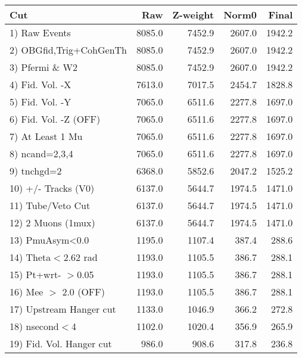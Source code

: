  \begin{table}[h!]\centering
 \begin{tabular}{||l||r|r|r|r||}
 \hline
 \hline
 Cut & Raw & Z-weight & Norm0 & Final \\
 \hline
  1) Raw Events           &      8085.0 &      7452.9 &      2607.0 &      1942.2 \\
  2) OBGfid,Trig+CohGenTh &      8085.0 &      7452.9 &      2607.0 &      1942.2 \\
  3) Pfermi \& W2         &      8085.0 &      7452.9 &      2607.0 &      1942.2 \\
  4) Fid. Vol. -X         &      7613.0 &      7017.5 &      2454.7 &      1828.8 \\
  5) Fid. Vol. -Y         &      7065.0 &      6511.6 &      2277.8 &      1697.0 \\
  6) Fid. Vol. -Z (OFF)   &      7065.0 &      6511.6 &      2277.8 &      1697.0 \\
  7) At Least 1 Mu        &      7065.0 &      6511.6 &      2277.8 &      1697.0 \\
  8) ncand=2,3,4          &      7065.0 &      6511.6 &      2277.8 &      1697.0 \\
  9) tnchgd=2             &      6368.0 &      5852.6 &      2047.2 &      1525.2 \\
 10) +/- Tracks (V0)      &      6137.0 &      5644.7 &      1974.5 &      1471.0 \\
 11) Tube/Veto Cut        &      6137.0 &      5644.7 &      1974.5 &      1471.0 \\
 12) 2 Muons (1mux)       &      6137.0 &      5644.7 &      1974.5 &      1471.0 \\
 13) PmuAsym<0.0          &      1195.0 &      1107.4 &       387.4 &       288.6 \\
 14) Theta$<$2.62 rad     &      1193.0 &      1105.5 &       386.7 &       288.1 \\
 15) Pt+wrt- $>$0.05      &      1193.0 &      1105.5 &       386.7 &       288.1 \\
 16) Mee $>$ 2.0  (OFF)   &      1193.0 &      1105.5 &       386.7 &       288.1 \\
 17) Upstream Hanger cut  &      1133.0 &      1046.9 &       366.2 &       272.8 \\
 18) nsecond$<$4          &      1102.0 &      1020.4 &       356.9 &       265.9 \\
 19) Fid. Vol. Hanger cut &       986.0 &       908.6 &       317.8 &       236.8 \\

\end{tabular}
\end{table}
